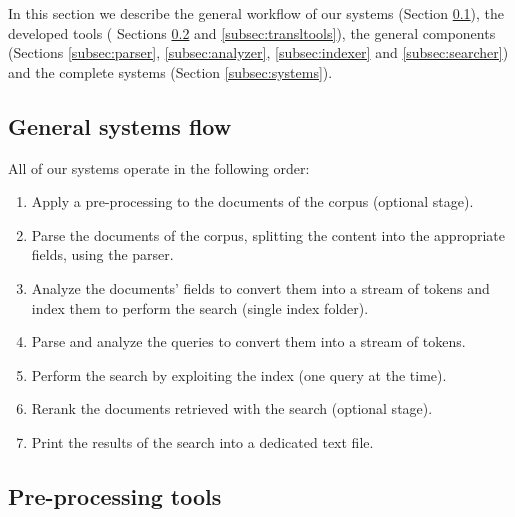 \par
In this section we describe the general workflow of our systems (Section \ref{subsec:genflow}), the developed tools ( Sections \ref{subsec:preprocess} and \ref{subsec:transltools}), the general components (Sections \ref{subsec:parser}, \ref{subsec:analyzer}, \ref{subsec:indexer} and \ref{subsec:searcher}) and the complete systems (Section \ref{subsec:systems}).

\subsection{General systems flow}
\label{subsec:genflow}
All of our systems operate in the following order:
\begin{enumerate}
	\item Apply a pre-processing to the documents of the corpus (optional stage).
	\item Parse the documents of the corpus, splitting the content into the appropriate fields, using the parser.
	\item Analyze the documents' fields to convert them into a stream of tokens and index them to perform the search (single index folder).
	\item Parse and analyze the queries to convert them into a stream of tokens.
	\item Perform the search by exploiting the index (one query at the time).
	\item Rerank the documents retrieved with the search (optional stage).
	\item Print the results of the search into a dedicated text file.
\end{enumerate}

\subsection{Pre-processing tools}
\label{subsec:preprocess}
